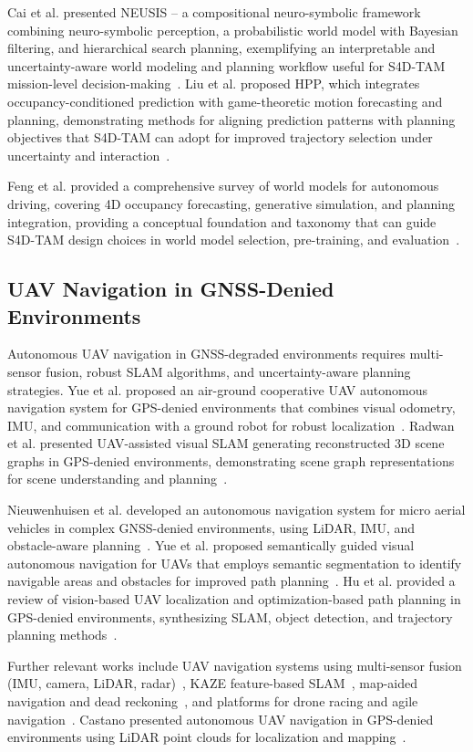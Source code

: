 Cai et al. presented NEUSIS -- a compositional neuro-symbolic framework combining neuro-symbolic perception, a probabilistic world model with Bayesian filtering, and hierarchical search planning, exemplifying an interpretable and uncertainty-aware world modeling and planning workflow useful for S4D-TAM mission-level decision-making~\cite{cai2024neusis}. Liu et al. proposed HPP, which integrates occupancy-conditioned prediction with game-theoretic motion forecasting and planning, demonstrating methods for aligning prediction patterns with planning objectives that S4D-TAM can adopt for improved trajectory selection under uncertainty and interaction~\cite{liu2025hybrid}.

Feng et al. provided a comprehensive survey of world models for autonomous driving, covering 4D occupancy forecasting, generative simulation, and planning integration, providing a conceptual foundation and taxonomy that can guide S4D-TAM design choices in world model selection, pre-training, and evaluation~\cite{feng2025survey}.

\subsection{UAV Navigation in GNSS-Denied Environments}
\label{subsec:gnss_denied}

Autonomous UAV navigation in GNSS-degraded environments requires multi-sensor fusion, robust SLAM algorithms, and uncertainty-aware planning strategies. Yue et al. proposed an air-ground cooperative UAV autonomous navigation system for GPS-denied environments that combines visual odometry, IMU, and communication with a ground robot for robust localization~\cite{yue2025airground}. Radwan et al. presented UAV-assisted visual SLAM generating reconstructed 3D scene graphs in GPS-denied environments, demonstrating scene graph representations for scene understanding and planning~\cite{radwan2024uav}.

Nieuwenhuisen et al. developed an autonomous navigation system for micro aerial vehicles in complex GNSS-denied environments, using LiDAR, IMU, and obstacle-aware planning~\cite{nieuwenhuisen2015autonomous, nieuwenhuisen2016autonomous}. Yue et al. proposed semantically guided visual autonomous navigation for UAVs that employs semantic segmentation to identify navigable areas and obstacles for improved path planning~\cite{yue2024semantic}. Hu et al. provided a review of vision-based UAV localization and optimization-based path planning in GPS-denied environments, synthesizing SLAM, object detection, and trajectory planning methods~\cite{hu2025review}.

Further relevant works include UAV navigation systems using multi-sensor fusion (IMU, camera, LiDAR, radar)~\cite{delmerico2018benchmark, qin2018vinsmono, shan2020liosam, zhang2014loam, xu2022fastlio2, faessler2015automatic}, KAZE feature-based SLAM~\cite{alcantarilla2013kaze}, map-aided navigation and dead reckoning~\cite{brossard2020aiimu}, and platforms for drone racing and agile navigation~\cite{delmerico2019uzhfpv}. Castano presented autonomous UAV navigation in GPS-denied environments using LiDAR point clouds for localization and mapping~\cite{castano2023autonomous}.
